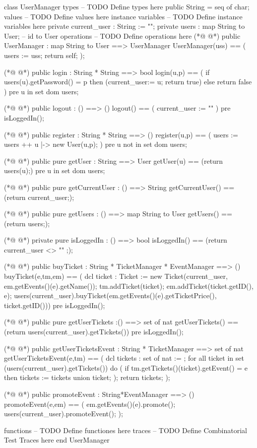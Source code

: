 \begin{vdmpp}[breaklines=true]
class UserManager
types
-- TODO Define types here
 public String = seq of char;
values
-- TODO Define values here
instance variables
-- TODO Define instance variables here
  private current_user : String := "";
 private users : map String to User; -- id to User
operations
-- TODO Define operations here
(*@
\label{UserManager:13}
@*)
 public UserManager : map String to User ==> UserManager
 UserManager(uss) == (
  users := uss;
  return self;
 );
 
(*@
\label{login:19}
@*)
 public login : String * String ==> bool
 login(u,p) == (
  if users(u).getPassword() = p
  then (current_user:= u; return true)
  else return false
 )
 pre u in set dom users;
 
(*@
\label{logout:27}
@*)
 public logout : () ==> ()
 logout() == (
  current_user := ""
 )
 pre isLoggedIn();
 
(*@
\label{register:33}
@*)
 public register : String * String ==> ()
 register(u,p) == (
  users := users ++ {u |-> new User(u,p)};
 )
 pre u not in set dom users;
 
(*@
\label{getUser:39}
@*)
 public pure getUser : String ==> User
 getUser(u) == (return users(u);)
 pre u in set dom users;

(*@
\label{getCurrentUser:43}
@*)
 public pure getCurrentUser : () ==> String
 getCurrentUser() == (return current_user;);
 
(*@
\label{getUsers:46}
@*)
 public pure getUsers : () ==> map String to User
 getUsers() == (return users;);
 
(*@
\label{isLoggedIn:49}
@*)
 private pure isLoggedIn : () ==> bool
 isLoggedIn() == (return current_user <> "" ;);
 
(*@
\label{buyTicket:52}
@*)
 public buyTicket : String * TicketManager * EventManager ==> ()
 buyTicket(e,tm,em) == (
 dcl ticket : Ticket := new Ticket(current_user, em.getEvents()(e).getName());
 tm.addTicket(ticket);
 em.addTicket(ticket.getID(), e);
 users(current_user).buyTicket(em.getEvents()(e).getTicketPrice(), ticket.getID()))
 pre isLoggedIn();
 
(*@
\label{getUserTickets:60}
@*)
 public pure getUserTickets :() ==> set of nat
 getUserTickets() == (return users(current_user).getTickets())
 pre isLoggedIn();
 
(*@
\label{getUserTicketsEvent:64}
@*)
 public getUserTicketsEvent : String * TicketManager ==> set of nat
 getUserTicketsEvent(e,tm) == (
  dcl tickets : set of nat := {};
  for all ticket in set (users(current_user).getTickets()) do 
  (
   if tm.getTickets()(ticket).getEvent() = e
    then tickets := tickets union {ticket};
  );
  return tickets;
 );
 
(*@
\label{promoteEvent:75}
@*)
 public promoteEvent : String*EventManager ==> ()
 promoteEvent(e,em) == (
  em.getEvents()(e).promote();
  users(current_user).promoteEvent();
 );
 
 
 
functions
-- TODO Define functiones here
traces
-- TODO Define Combinatorial Test Traces here
end UserManager
\end{vdmpp}
